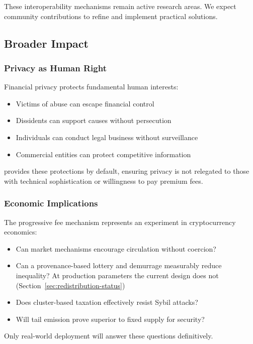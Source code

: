 These interoperability mechanisms remain active research areas. We expect
community contributions to refine and implement practical solutions.

\subsection{Broader Impact}

\subsubsection{Privacy as Human Right}

Financial privacy protects fundamental human interests:

\begin{itemize}
  \item Victims of abuse can escape financial control
  \item Dissidents can support causes without persecution
  \item Individuals can conduct legal business without surveillance
  \item Commercial entities can protect competitive information
\end{itemize}

\Botho provides these protections by default, ensuring privacy is not
relegated to those with technical sophistication or willingness to pay
premium fees.

\subsubsection{Economic Implications}

The progressive fee mechanism represents an experiment in cryptocurrency
economics:

\begin{itemize}
  \item Can market mechanisms encourage circulation without coercion?
  \item Can a provenance-based lottery and demurrage measurably reduce
    inequality? At production parameters the current design does not
    (Section~\ref{sec:redistribution-status})
  \item Does cluster-based taxation effectively resist Sybil attacks?
  \item Will tail emission prove superior to fixed supply for security?
\end{itemize}

Only real-world deployment will answer these questions definitively.

